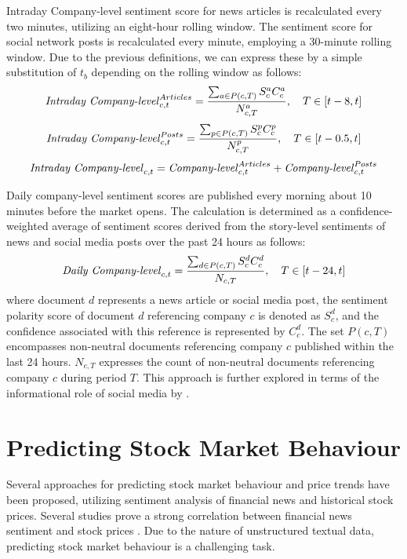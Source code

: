 Intraday Company-level sentiment score for news articles is recalculated every two minutes, utilizing an eight-hour rolling window. The sentiment score for social network posts is recalculated every minute, employing a 30-minute rolling window. Due to the previous definitions, we can express these by a simple substitution of $t_{b}$ depending on the rolling window as follows:
\begin{equation}
    \label{eq:intraday-company-level-article-sentiment}
    \text{\textit{Intraday Company-level}}_{c,t}^{Articles} = \frac{\sum_{a \in P(c,T)} S_{c}^{a} C_{c}^{a}}{N_{c,T}^{a}}, \quad T \in [t-8, t]
\end{equation}
\begin{equation}
    \label{eq:intraday-company-level-post-sentiment}
    \text{\textit{Intraday Company-level}}_{c,t}^{Posts} = \frac{\sum_{p \in P(c,T)} S_{c}^{p} C_{c}^{p}}{N_{c,T}^{p}}, \quad T \in [t-0.5, t]
\end{equation}
\begin{equation}
    \label{eq:intraday-company-level-sentiment}
    \text{\textit{Intraday Company-level}}_{c,t} = \text{\textit{Company-level}}_{c,t}^{Articles} + \text{\textit{Company-level}}_{c,t}^{Posts}
\end{equation}

Daily company-level sentiment scores are published every morning about 10 minutes before the market opens. The calculation is determined as a confidence-weighted average of sentiment scores derived from the story-level sentiments of news and social media posts over the past 24 hours as follows:
\begin{equation}
    \label{eq:daily-company-level-sentiment}
    \text{\textit{Daily Company-level}}_{c,t} = \frac{\sum_{d \in P(c,T)} S_{c}^{d} C_{c}^{d}}{N_{c,T}}, \quad T \in [t-24, t]
\end{equation} where document $d$ represents a news article or social media post, the sentiment polarity score of document $d$ referencing company $c$ is denoted as $S_{c}^{d}$, and the confidence associated with this reference is represented by $C_{c}^{d}$. The set $P(c,T)$ encompasses non-neutral documents referencing company $c$ published within the last 24 hours. $N_{c,T}$ expresses the count of non-neutral documents referencing company $c$ during period $T$. This approach is further explored in terms of the informational role of social media by \textcite{chenInformationalRole}.

\section{Predicting Stock Market Behaviour}
\label{sec:predicting-stock-market-behaviour}
Several approaches for predicting stock market behaviour and price trends have been proposed, utilizing sentiment analysis of financial news and historical stock prices. Several studies prove a strong correlation between financial news sentiment and stock prices \parencite{li2014newsimpact} \parencite{Wan2021}. Due to the nature of unstructured textual data, predicting stock market behaviour is a challenging task.

